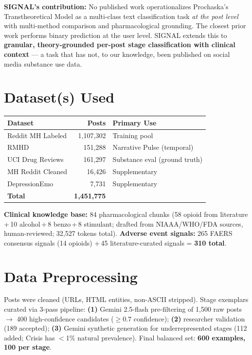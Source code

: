 \documentclass[10pt,twocolumn]{article}
\begin{document}
\textbf{SIGNAL's contribution:} No published work operationalizes Prochaska's
Transtheoretical Model as a multi-class text classification task \textit{at
the post level} with multi-method comparison and pharmacological grounding.
The closest prior work performs binary prediction at the user level. SIGNAL
extends this to \textbf{granular, theory-grounded per-post stage
classification with clinical context} --- a task that has not, to our
knowledge, been published on social media substance use data.

\section{Dataset(s) Used}

\begin{center}{\small\setlength{\tabcolsep}{4pt}
\begin{tabular}{@{}lrl@{}}
\toprule
\textbf{Dataset}       & \textbf{Posts}     & \textbf{Primary Use}\\
\midrule
Reddit MH Labeled      & 1,107,302 & Training pool\\
RMHD                   &   151,288 & Narrative Pulse (temporal)\\
UCI Drug Reviews       &   161,297 & Substance eval (ground truth)\\
MH Reddit Cleaned      &    16,426 & Supplementary\\
DepressionEmo          &     7,731 & Supplementary\\
\midrule
\textbf{Total}         & \textbf{1,451,775} &\\
\bottomrule
\end{tabular}}\end{center}

\noindent\textbf{Clinical knowledge base:} 84 pharmacological chunks (58 opioid
from literature\,+\,10 alcohol\,+\,8 benzo\,+\,8 stimulant; drafted from
NIAAA/WHO/FDA sources, human-reviewed; 32,527 tokens total).
\textbf{Adverse event signals:} 265 FAERS consensus signals (14 opioids)
+\,45 literature-curated signals = \textbf{310 total}.

\section{Data Preprocessing}

Posts were cleaned (URLs, HTML entities, non-ASCII stripped). Stage exemplars
curated via 3-pass pipeline: \textbf{(1)} Gemini 2.5-flash pre-filtering of
1,500 raw posts $\to$ 400 high-confidence candidates (${\geq}0.7$ confidence);
\textbf{(2)} researcher validation (189 accepted); \textbf{(3)} Gemini
synthetic generation for underrepresented stages (112 added; Crisis has
$<$1\% natural prevalence). Final balanced set: \textbf{600 examples,
100 per stage}.
\end{document}
